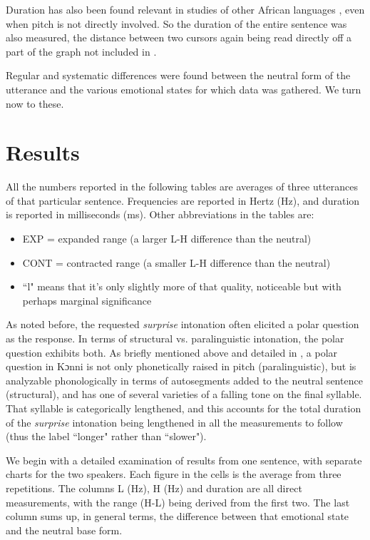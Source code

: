 \documentclass[output=paper]{langsci/langscibook}
\begin{document}
Duration has also been found relevant in studies of other African languages \citep{hymanmonaka2011,fiedlerjannedy2013}, even when pitch is not directly involved. So the duration of the entire sentence was also measured, the distance between two cursors again being read directly off a part of the graph not included in .

Regular and systematic differences were found between the neutral form of the utterance and the various emotional states for which data was gathered. We turn now to these. 

\section{Results }
All the numbers reported in the following tables are averages of three utterances of that particular sentence. Frequencies are reported in Hertz (Hz), and duration is reported in milliseconds (ms). Other abbreviations in the tables are: 

\begin{itemize}
\item EXP = expanded range (a larger L-H difference than the neutral)
\item CONT = contracted range (a smaller L-H difference than the neutral)
\item ``l" means that it's only slightly more of that quality, noticeable but with perhaps marginal significance 
\end{itemize}

As noted before, the requested \emph{surprise} intonation often elicited a polar question as the response. In terms of structural vs. paralinguistic intonation, the polar question exhibits both. As briefly mentioned above and detailed in \citet{cahill2012}, a polar question in Kɔnni is not only phonetically raised in pitch (paralinguistic), but is analyzable phonologically in terms of autosegments added to the neutral sentence (structural), and has one of several varieties of a falling tone on the final syllable. That syllable is categorically lengthened, and this accounts for the total duration of the \emph{surprise} intonation being lengthened in all the measurements to follow (thus the label ``longer" rather than ``slower").



We begin with a detailed examination of results from one sentence, with separate charts for the two speakers. Each figure in the cells is the average from three repetitions. The columns L (Hz), H (Hz) and duration are all direct measurements, with the range (H-L) being derived from the first two. The last column sums up, in general terms, the difference between that emotional state and the neutral base form. 
\end{document}
